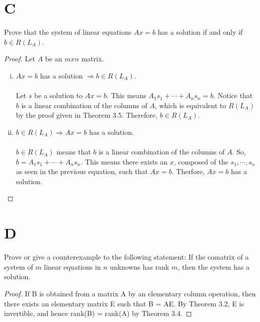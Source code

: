 \documentclass[11pt]{scrartcl}
\begin{document}
\section{C}
Prove that the system of linear equations $Ax = b$ has a solution if and only if $b \in R(L_A)$.
\begin{proof}
	Let $A$ be an $mxn$ matrix.
	\begin{enumerate}[i.]
		\item{
			$Ax = b$ has a solution $\Rightarrow b \in R(L_A)$.\\\-\\
			Let $s$ be a solution to $Ax = b$. This means $A_1s_1 + \cdots + A_ns_n = b$. 
			Notice that $b$ is a linear combination of the columns of $A$, 
			which is equivalent to $R(L_A)$ by the proof given in Theorem 3.5. 
			Therefore, $b \in R(L_A)$.
		}
		\item{
			$b \in R(L_A) \Rightarrow Ax = b$ has a solution.\\\-\\
			$b \in R(L_A)$ means that $b$ is a linear combination of the columns of $A$. 
			So, $b = A_1s_1 + \cdots + A_ns_n$. 
			This means there exists an $x$, composed of the $s_1, \cdots, s_n$ as seen in the previous equation, such that $Ax = b$.  
			Therfore, $Ax = b$ has a solution.
		}
	\end{enumerate}
\end{proof}

\section{D}
Prove or give a counterexample to the following statement: If the comatrix of a system of $m$ linear equations in
$n$ unknowns has rank $m$, then the system has a solution.
\begin{proof}
	If B is obtained from a matrix A by an elementary column operation,
	then there exists an elementary matrix E such that B = AE. By Theorem 3.2, 
	E is invertible, and hence rank(B) = rank(A) by Theorem 3.4. 
\end{proof}
	
\end{document}

